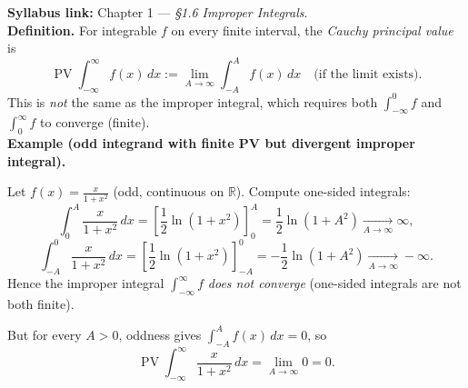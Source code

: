 \begin{extension}[title={Extension (Beyond Syllabus: Cauchy principal value vs.\ improper integral)}]
\textbf{Syllabus link:} Chapter 1 — \emph{§1.6 Improper Integrals}.\\
\textbf{Definition.} For integrable $f$ on every finite interval, the \emph{Cauchy principal value} is
\[
\operatorname{PV}\!\int_{-\infty}^{\infty} f(x)\,dx := \lim_{A\to\infty}\int_{-A}^{A} f(x)\,dx
\quad\text{(if the limit exists).}
\]
This is \emph{not} the same as the improper integral, which requires both $\int_{-\infty}^{0} f$ and $\int_{0}^{\infty} f$ to converge (finite).\\
\textbf{Example (odd integrand with finite PV but divergent improper integral).}

Let $f(x)=\frac{x}{1+x^2}$ (odd, continuous on $\mathbb{R}$).
Compute one-sided integrals:
\[
\int_{0}^{A}\frac{x}{1+x^2}\,dx=\left[\frac12\ln(1+x^2)\right]_{0}^{A}=\frac12\ln(1+A^2)\xrightarrow[A\to\infty]{}\infty,
\]
\[
\int_{-A}^{0}\frac{x}{1+x^2}\,dx=\left[\frac12\ln(1+x^2)\right]_{-A}^{0}= -\frac12\ln(1+A^2)\xrightarrow[A\to\infty]{}-\infty.
\]
Hence the improper integral $\int_{-\infty}^{\infty} f$ \emph{does not converge} (one-sided integrals are not both finite).

But for every $A>0$, oddness gives $\int_{-A}^{A} f(x)\,dx=0$, so
\[
\operatorname{PV}\!\int_{-\infty}^{\infty}\frac{x}{1+x^2}\,dx=\lim_{A\to\infty}0=0.
\]
\end{extension}

%

